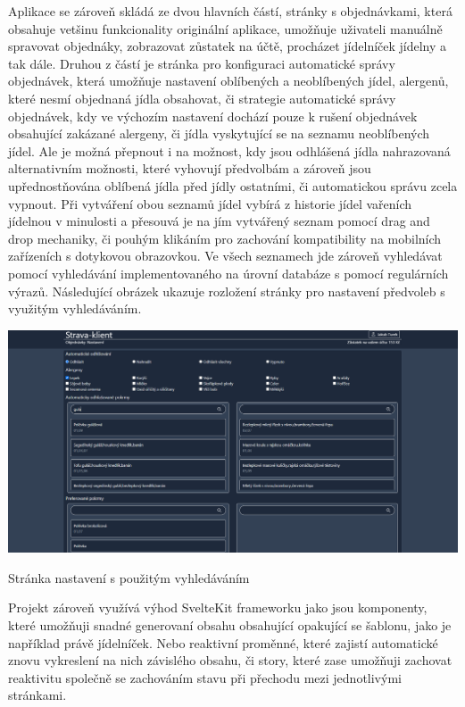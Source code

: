 \documentclass[12pt]{article}
\begin{document}
Aplikace se zároveň skládá ze dvou hlavních částí, stránky s objednávkami, která obsahuje vetšinu funkcionality originální aplikace, umožňuje uživateli manuálně spravovat objednáky, zobrazovat zůstatek na účtě, procházet jídelníček jídelny a tak dále. Druhou z částí je stránka pro konfiguraci automatické správy objednávek, která umožňuje nastavení oblíbených a neoblíbených jídel, alergenů, které nesmí objednaná jídla obsahovat, či strategie automatické správy objednávek, kdy ve výchozím nastavení dochází pouze k rušení objednávek obsahující zakázané alergeny, či jídla vyskytující se na seznamu neoblíbených jídel. Ale je možná přepnout i na možnost, kdy jsou odhlášená jídla nahrazovaná alternativním možnosti, které vyhovují předvolbám a zároveň jsou upřednostňována oblíbená jídla před jídly ostatními, či automatickou správu zcela vypnout. Při vytváření obou seznamů jídel vybírá z historie jídel vařeních jídelnou v minulosti a přesouvá je na jím vytvářený seznam pomocí drag and drop mechaniky, či pouhým klikáním pro zachování kompatibility na mobilních zařízeních s dotykovou obrazovkou\cite{drag}. Ve všech seznamech jde zároveň vyhledávat pomocí vyhledávání implementovaného na úrovní databáze\cite{search} s pomocí regulárních výrazů\cite{regex}. Následující obrázek ukazuje rozložení stránky pro nastavení předvoleb s využitým vyhledáváním.

\begin{listing}[!ht]
\includegraphics[scale=0.75, width=15cm]{pictures/settings.png}\par
\caption{Stránka nastavení s použitým vyhledáváním}
\end{listing}

Projekt zároveň využívá výhod SvelteKit frameworku jako jsou komponenty, které umožňuji snadné generovaní obsahu obsahující opakující se šablonu, jako je například právě jídelníček. Nebo reaktivní proměnné, které zajistí automatické znovu vykreslení na nich závislého obsahu\cite{reactive}, či story\cite{store}, které zase umožňuji zachovat reaktivitu společně se zachováním stavu při přechodu mezi jednotlivými stránkami\cite{store-sync}.
\end{document}
